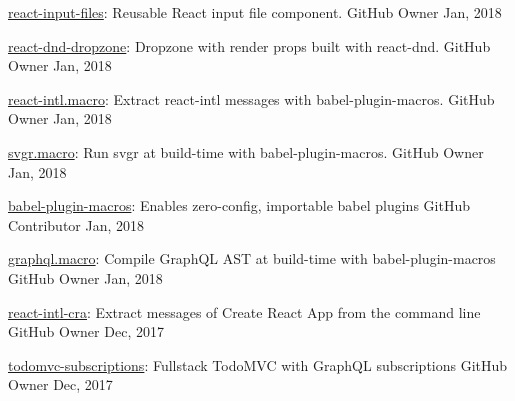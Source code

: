 \begin{cvhonors}
  \cvhonor
    {\href{https://github.com/evenchange4/react-input-files}{react-input-files}: \textmd{Reusable React input file component.}} %
    {GitHub} %
    {Owner} %
    {Jan, 2018} %

  \cvhonor
    {\href{https://github.com/evenchange4/react-dnd-dropzone}{react-dnd-dropzone}: \textmd{Dropzone with render props built with react-dnd.}} %
    {GitHub} %
    {Owner} %
    {Jan, 2018} %

  \cvhonor
    {\href{https://github.com/evenchange4/react-intl.macro}{react-intl.macro}: \textmd{Extract react-intl messages with babel-plugin-macros.}} %
    {GitHub} %
    {Owner} %
    {Jan, 2018} %

  \cvhonor
    {\href{https://github.com/evenchange4/svgr.macro}{svgr.macro}: \textmd{Run svgr at build-time with babel-plugin-macros.}} %
    {GitHub} %
    {Owner} %
    {Jan, 2018} %

  \cvhonor
    {\href{https://github.com/kentcdodds/babel-plugin-macros}{babel-plugin-macros}: \textmd{Enables zero-config, importable babel plugins}} %
    {GitHub} %
    {Contributor} %
    {Jan, 2018} %

  \cvhonor
    {\href{https://github.com/evenchange4/graphql.macro}{graphql.macro}: \textmd{Compile GraphQL AST at build-time with babel-plugin-macros}}
    {GitHub} %
    {Owner} %
    {Jan, 2018} %

  \cvhonor
    {\href{https://github.com/evenchange4/react-intl-cra}{react-intl-cra}: \textmd{Extract messages of Create React App from the command line}}
    {GitHub} %
    {Owner} %
    {Dec, 2017} %

  \cvhonor
    {\href{https://github.com/evenchange4/todomvc-subscriptions}{todomvc-subscriptions}: \textmd{Fullstack TodoMVC with GraphQL subscriptions}}
    {GitHub} %
    {Owner} %
    {Dec, 2017} %


\end{cvhonors}
